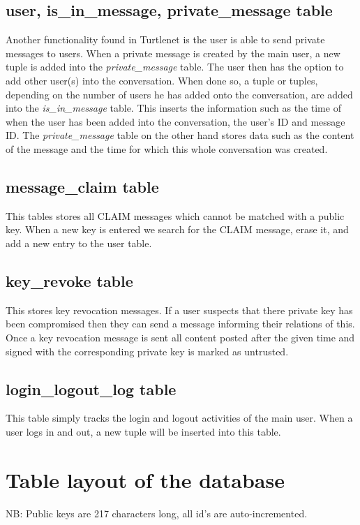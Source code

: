 \subsection{user, is\_in\_message, private\_message table}
Another functionality found in Turtlenet is the user is able to send private 
messages to users. When a private message is created by the main user, a new 
tuple is added into the {\it private\_message} table. The user then has the 
option to add other user(s) into the conversation. When done so, a tuple or 
tuples, depending on the number of users he has added onto the conversation, are 
added into the {\it is\_in\_message} table. This inserts the information such as 
the time of when the user has been added into the conversation, the user's ID 
and message ID. The {\it private\_message} table on the other hand stores data 
such as the content of the message and the time for which this whole conversation 
was created. 

\subsection{message\_claim table}
This tables stores all CLAIM messages which cannot be matched with a public key.
When a new key is entered we search for the CLAIM message, erase it, and add a
new entry to the user table.

\subsection{key\_revoke table}
This stores key revocation messages. If a user suspects that there private key
has been compromised then they can send a message informing their relations of
this. Once a key revocation message is sent all content posted after the given
time and signed with the corresponding private key is marked as untrusted.

\subsection{login\_logout\_log table}
This table simply tracks the login and logout activities of the main user. When a 
user logs in and out, a new tuple will be inserted into this table.

\clearpage

\section{Table layout of the database}
NB: Public keys are 217 characters long, all id's are auto-incremented.

